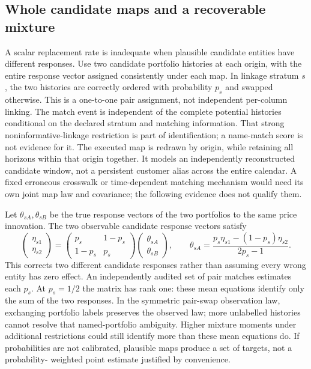\subsection{Whole candidate maps and a recoverable mixture}
A scalar replacement rate is inadequate when plausible candidate entities
have different responses. Use two candidate portfolio histories at each
origin, with the entire response vector assigned consistently under each
map. In linkage stratum $s$, the two histories are correctly ordered with
probability $p_s$ and swapped otherwise. This is a one-to-one pair assignment,
not independent per-column linking. The match event is independent of the
complete potential histories conditional on the declared stratum and
matching information. That strong noninformative-linkage restriction is
part of identification; a name-match score is not evidence for it.
The executed map is redrawn by origin, while retaining all horizons within
that origin together. It models an independently reconstructed candidate
window, not a persistent customer alias across the entire calendar. A fixed
erroneous crosswalk or time-dependent matching mechanism would need its own
joint map law and covariance; the following evidence does not qualify them.

Let $\theta_{sA},\theta_{sB}$ be the true response vectors of the two
portfolios to the same price innovation. The two observable candidate
response vectors satisfy
\begin{equation}
 \begin{pmatrix}\eta_{s1}\\\eta_{s2}\end{pmatrix}
 =\begin{pmatrix}p_s&1-p_s\\1-p_s&p_s\end{pmatrix}
   \begin{pmatrix}\theta_{sA}\\\theta_{sB}\end{pmatrix},\qquad
 \theta_{sA}=\frac{p_s\eta_{s1}-(1-p_s)\eta_{s2}}{2p_s-1}.
 \label{s6:pair-mixing}
\end{equation}
This corrects two different candidate responses rather than assuming every
wrong entity has zero effect. An independently audited set of pair matches
estimates each $p_s$. At $p_s=1/2$ the matrix has rank one: these mean
equations identify only the sum of the two responses. In the symmetric
pair-swap observation law, exchanging portfolio labels preserves the
observed law; more unlabelled histories cannot resolve that named-portfolio
ambiguity. Higher mixture moments under additional restrictions could still
identify more than these mean equations do. If probabilities are not
calibrated, plausible maps produce a set of targets, not a probability-
weighted point estimate justified by convenience.

